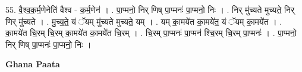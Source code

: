 \documentclass[17pt]{extarticle}
\begin{document}
55. वै॒श्व॒क॒र्म॒णेनेति॑ वैश्व - क॒र्म॒णेन॑ । . पा॒प्मनो॒ निर् णिष् पा॒प्मनः॑ पा॒प्मनो॒ निः । . निर् मु॑च्यते मुच्यते॒ निर् णिर् मु॑च्यते । . मु॒च्य॒ते॒ यं ॅयम् मु॑च्यते मुच्यते॒ यम् । . यम् का॒मये॑त का॒मये॑त॒ यं ॅयम् का॒मये॑त । . का॒मये॑त चि॒रम् चि॒रम् का॒मये॑त का॒मये॑त चि॒रम् । . चि॒रम् पा॒प्मनः॑ पा॒प्मन॑ श्चि॒रम् चि॒रम् पा॒प्मनः॑ । . पा॒प्मनो॒ निर् णिष् पा॒प्मनः॑ पा॒प्मनो॒ निः । \newline

\textbf{Ghana Paata } \newline
\end{document}
